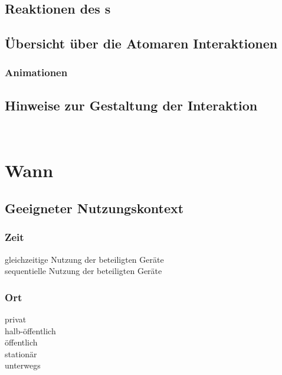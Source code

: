 		\subsection*{Reaktionen des \sendev s}
		\reactionSen
	\fi
\fi	

\ifx\microinteractionstabular\undefined
\else
	\subsection*{Übersicht über die Atomaren Interaktionen}
	\microinteractionstabular
\fi

\ifx\animations\undefined
\else
	\subsubsection*{Animationen}
	\animations
\fi

\subsection*{Hinweise zur Gestaltung der Interaktion}
\designnotes
\


\section*{Wann}

\subsection*{Geeigneter Nutzungskontext}
\validcontext

\subsubsection*{Zeit}
\checkbox{\simultaneously} gleichzeitige Nutzung der beteiligten Geräte \\
\checkbox{\sequentially} sequentielle Nutzung der beteiligten Geräte

\subsubsection*{Ort}
\checkbox{\private} privat \\
\checkbox{\semipublic} halb-öffentlich \\
\checkbox{\public} öffentlich \\
\checkbox{\stationary} stationär \\
\checkbox{\onthego} unterwegs 

